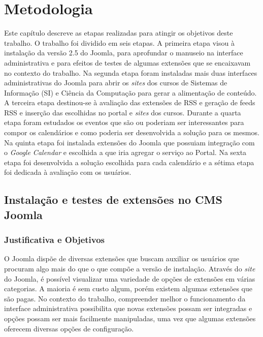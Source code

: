 \chapter{Metodologia}
Este capítulo descreve as etapas realizadas para atingir os objetivos deste trabalho. O trabalho foi dividido em seis etapas. A primeira etapa visou à instalação da versão 2.5 do Joomla, para aprofundar o manuseio na interface administrativa e para efeitos de testes de algumas extensões que se encaixavam no contexto do trabalho. Na segunda etapa foram instaladas mais duas interfaces administrativas do Joomla para abrir os \emph{sites} dos cursos de Sistemas de Informação (SI) e Ciência da Computação para gerar a alimentação de conteúdo. A terceira etapa destinou-se à avaliação das extensões de RSS e geração de feeds RSS e inserção das escolhidas no portal e \emph{sites} dos cursos. Durante a quarta etapa foram estudados os eventos que são ou poderiam ser interessantes para compor os calendários e como poderia ser desenvolvida a solução para os mesmos. Na quinta etapa foi instalada extensões do Joomla que possuiam integração com o \emph{Google Calendar} e escolhida a que iria agregar o serviço ao Portal. Na sexta etapa foi desenvolvida a solução escolhida para cada calendário e a sétima etapa foi dedicada à avaliação com os usuários.


\section{Instalação e testes de extensões no CMS Joomla}
\subsection{Justificativa e Objetivos}
O Joomla dispõe de diversas extensões que buscam auxiliar os usuários que procuram algo mais do que o que compõe a versão de instalação. Através do \emph{site} do Joomla, é possível visualizar uma variedade de opções de extensões em várias categorias. A maioria é sem custo algum, porém existem algumas extensões que são pagas.
No contexto do trabalho, compreender melhor o funcionamento da interface administrativa possibilita que novas extensões possam ser integradas e opções possam ser mais facilmente manipuladas, uma vez que algumas extensões oferecem diversas opções de configuração.

